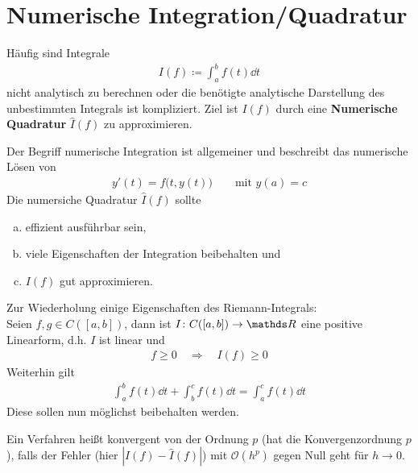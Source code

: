 % 
% 
% 
% 

\chapter{Numerische Integration/Quadratur}

Häufig sind Integrale
\begin{gather*}
  I(f) \coloneqq \int_a^bf(t)\dd t
\end{gather*}
nicht analytisch zu berechnen
oder die benötigte analytische Darstellung
des unbestimmten Integrals ist kompliziert.
Ziel ist $I(f)$ durch eine 
\textbf{Numerische Quadratur}
$\hat{I}(f)$ zu approximieren.

Der Begriff numerische Integration ist allgemeiner und
beschreibt das numerische Lösen von
\begin{gather*}
  y'(t) = f\big(t,y(t)\big) \qquad \text{mit } y(a)=c
\end{gather*}
Die numersiche Quadratur $\hat{I}(f)$ sollte
\begin{enumerate}[a)]
\item effizient ausführbar sein,
\item viele Eigenschaften der Integration beibehalten und
\item $I(f)$ gut approximieren.
\end{enumerate}
Zur Wiederholung einige Eigenschaften des Riemann-Integrals:\\
Seien $f,g\in C([a,b])$, dann ist $I\colon C([a,b])\to\R$
eine positive Linearform, d.h. $I$ ist linear und 
\begin{gather}
  f\geq 0 \quad \Rightarrow \quad I(f)\geq 0
  \label{VII.1.1}
\end{gather}
Weiterhin gilt
\begin{gather}
  \int_a^b f(t)\dd t + \int_b^c f(t)\dd t = \int_a^cf(t)\dd t
  \label{VII.1.2}
\end{gather}
Diese sollen nun möglichst beibehalten werden.

\begin{Defe}\label{7.1.1}
  Ein Verfahren heißt konvergent von der Ordnung $p$
  (hat die Konvergenzordnung $p$),
  falls der Fehler (hier $|I(f)-\hat{I}(f)|$)
  mit $\mathcal{O}(h^p)$ gegen Null geht für $h\to 0$.
\end{Defe}

